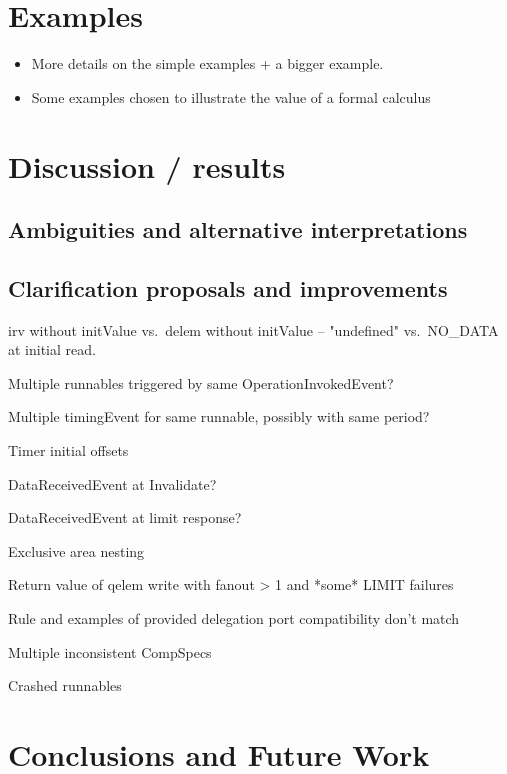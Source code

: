 \documentclass[twocolumn]{article}
\begin{document}
\section{Examples}
\label{sec:Examples}

\begin{itemize}
\item More details on the simple examples + a bigger example.
\item Some examples chosen to illustrate the value of a formal calculus
\end{itemize}

\section{Discussion / results}
\label{sec:Disc}

\subsection{Ambiguities and alternative interpretations}
\label{sec:DiscAmb}

\subsection{Clarification proposals and improvements}
\label{sec:DiscImp}

irv without initValue vs.\ delem without initValue -- "undefined" vs.\ NO\_DATA at initial read.

Multiple runnables triggered by same OperationInvokedEvent?

Multiple timingEvent for same runnable, possibly with same period?

Timer initial offsets

DataReceivedEvent at Invalidate?

DataReceivedEvent at limit response?

Exclusive area nesting

Return value of qelem write with fanout > 1 and *some* LIMIT failures

Rule and examples of provided delegation port compatibility don't match

Multiple inconsistent CompSpecs

Crashed runnables


\section{Conclusions and Future Work}
\label{sec:Conc}
\end{document}
